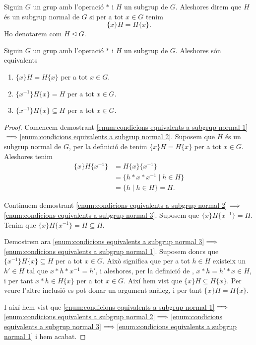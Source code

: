 \documentclass[../Apunts.tex]{subfiles}
\begin{document}
	\begin{definition}
		\label{def:subgrup normal}
		Siguin \(G\) un grup amb l'operació \(\ast\) i \(H\) un subgrup de \(G\). Aleshores direm que \(H\) és un subgrup normal de \(G\) si per a tot \(x\in G\) tenim
		\[\{x\}H=H\{x\}.\]
		Ho denotarem com \(H\trianglelefteq G\).
	\end{definition}
	\begin{proposition}
		\label{prop:condicions equivalents a subgrup normal}
		Siguin \(G\) un grup amb l'operació \(\ast\) i \(H\) un subgrup de \(G\). Aleshores són equivalents
		\begin{enumerate}
			\item\label{enum:condicions equivalents a subgrup normal 1} \(\{x\}H=H\{x\}\) per a tot \(x\in G\).
			\item\label{enum:condicions equivalents a subgrup normal 2} \(\{x^{-1}\}H\{x\}=H\) per a tot \(x\in G\).
			\item\label{enum:condicions equivalents a subgrup normal 3} \(\{x^{-1}\}H\{x\}\subseteq H\) per a tot \(x\in G\).
		\end{enumerate}
		\begin{proof}
			Comencem demostrant \eqref{enum:condicions equivalents a subgrup normal 1}\(\implies\)\eqref{enum:condicions equivalents a subgrup normal 2}. Suposem que \(H\) és un subgrup normal de \(G\), per la definició de  tenim \(\{x\}H=H\{x\}\) per a tot \(x\in G\). Aleshores tenim
			\begin{align*}
			\{x\}H\{x^{-1}\}&=H\{x\}\{x^{-1}\}\\
			&=\{h\ast x\ast x^{-1}\mid h\in H\}\\
			&=\{h\mid h\in H\}=H.
			\end{align*}
			
			Continuem demostrant \eqref{enum:condicions equivalents a subgrup normal 2}\(\implies\)\eqref{enum:condicions equivalents a subgrup normal 3}. Suposem que \(\{x\}H\{x^{-1}\}=H\). Tenim que \(\{x\}H\{x^{-1}\}=H\subseteq H\).
			
			Demostrem ara \eqref{enum:condicions equivalents a subgrup normal 3}\(\implies\)\eqref{enum:condicions equivalents a subgrup normal 1}. Suposem doncs que \(\{x^{-1}\}H\{x\}\subseteq H\) per a tot \(x\in G\). Això significa que per a tot \(h\in H\) existeix un \(h'\in H\) tal que \(x\ast h\ast x^{-1}=h'\), i aleshores, per la definició de , \(x\ast h=h'\ast x\in H\), i per tant \(x\ast h\in H\{x\}\) per a tot \(x\in G\). Així hem vist que \(\{x\}H\subseteq H\{x\}\). Per veure l'altre inclusió es pot donar un argument anàleg, i per tant \(\{x\}H= H\{x\}\). %
			
			I així hem vist que \eqref{enum:condicions equivalents a subgrup normal 1}\(\implies\)\eqref{enum:condicions equivalents a subgrup normal 2}\(\implies\)\eqref{enum:condicions equivalents a subgrup normal 3}\(\implies\)\eqref{enum:condicions equivalents a subgrup normal 1} i hem acabat.
		\end{proof}
	\end{proposition}
\end{document}

